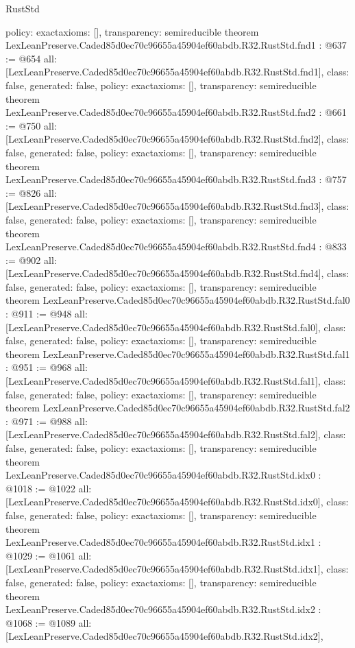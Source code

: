 \begin{lexlean}{RustStd}
\begin{coremodule}
{  policy: exact{axioms: []},
  transparency: semireducible
}
theorem LexLeanPreserve.Caded85d0ec70c96655a45904ef60abdb.R32.RustStd.fnd1 : @637 := @654 {
  all: [LexLeanPreserve.Caded85d0ec70c96655a45904ef60abdb.R32.RustStd.fnd1],
  class: false,
  generated: false,
  policy: exact{axioms: []},
  transparency: semireducible
}
theorem LexLeanPreserve.Caded85d0ec70c96655a45904ef60abdb.R32.RustStd.fnd2 : @661 := @750 {
  all: [LexLeanPreserve.Caded85d0ec70c96655a45904ef60abdb.R32.RustStd.fnd2],
  class: false,
  generated: false,
  policy: exact{axioms: []},
  transparency: semireducible
}
theorem LexLeanPreserve.Caded85d0ec70c96655a45904ef60abdb.R32.RustStd.fnd3 : @757 := @826 {
  all: [LexLeanPreserve.Caded85d0ec70c96655a45904ef60abdb.R32.RustStd.fnd3],
  class: false,
  generated: false,
  policy: exact{axioms: []},
  transparency: semireducible
}
theorem LexLeanPreserve.Caded85d0ec70c96655a45904ef60abdb.R32.RustStd.fnd4 : @833 := @902 {
  all: [LexLeanPreserve.Caded85d0ec70c96655a45904ef60abdb.R32.RustStd.fnd4],
  class: false,
  generated: false,
  policy: exact{axioms: []},
  transparency: semireducible
}
theorem LexLeanPreserve.Caded85d0ec70c96655a45904ef60abdb.R32.RustStd.fal0 : @911 := @948 {
  all: [LexLeanPreserve.Caded85d0ec70c96655a45904ef60abdb.R32.RustStd.fal0],
  class: false,
  generated: false,
  policy: exact{axioms: []},
  transparency: semireducible
}
theorem LexLeanPreserve.Caded85d0ec70c96655a45904ef60abdb.R32.RustStd.fal1 : @951 := @968 {
  all: [LexLeanPreserve.Caded85d0ec70c96655a45904ef60abdb.R32.RustStd.fal1],
  class: false,
  generated: false,
  policy: exact{axioms: []},
  transparency: semireducible
}
theorem LexLeanPreserve.Caded85d0ec70c96655a45904ef60abdb.R32.RustStd.fal2 : @971 := @988 {
  all: [LexLeanPreserve.Caded85d0ec70c96655a45904ef60abdb.R32.RustStd.fal2],
  class: false,
  generated: false,
  policy: exact{axioms: []},
  transparency: semireducible
}
theorem LexLeanPreserve.Caded85d0ec70c96655a45904ef60abdb.R32.RustStd.idx0 : @1018 := @1022 {
  all: [LexLeanPreserve.Caded85d0ec70c96655a45904ef60abdb.R32.RustStd.idx0],
  class: false,
  generated: false,
  policy: exact{axioms: []},
  transparency: semireducible
}
theorem LexLeanPreserve.Caded85d0ec70c96655a45904ef60abdb.R32.RustStd.idx1 : @1029 := @1061 {
  all: [LexLeanPreserve.Caded85d0ec70c96655a45904ef60abdb.R32.RustStd.idx1],
  class: false,
  generated: false,
  policy: exact{axioms: []},
  transparency: semireducible
}
theorem LexLeanPreserve.Caded85d0ec70c96655a45904ef60abdb.R32.RustStd.idx2 : @1068 := @1089 {
  all: [LexLeanPreserve.Caded85d0ec70c96655a45904ef60abdb.R32.RustStd.idx2],
}
\end{coremodule}
\end{lexlean}
